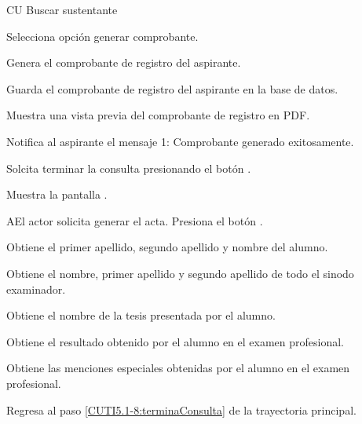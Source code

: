 \begin{UCtrayectoria}
	
	\UCpaso[\UCsist] CU Buscar sustentante
	
	\UCpaso[\UCsist] Selecciona opción generar comprobante.
	
	
	\UCpaso[\UCsist] Genera el comprobante de registro del aspirante.
	
	
	\UCpaso[\UCsist] Guarda el comprobante de registro del aspirante en la base de datos. 
	
	
	\UCpaso[\UCsist]Muestra una vista previa del comprobante de registro en PDF.
	
	
	\UCpaso[\UCsist] Notifica al aspirante el mensaje 1: Comprobante generado exitosamente.
	
	
	\UCpaso[\UCactor] Solcita terminar la consulta presionando el botón .  \label{CUTI5.1-8:terminaConsulta}
	
	\UCpaso[\UCsist] Muestra la pantalla .
	
\end{UCtrayectoria}


\begin{UCtrayectoriaA}{A}{El actor solicita generar el acta.}
	\UCpaso[\UCactor] Presiona el botón .
	
	\UCpaso[\UCsist] Obtiene el primer apellido, segundo apellido y nombre del alumno.
	
	\UCpaso[\UCsist] Obtiene el nombre, primer apellido y segundo apellido de todo el sinodo examinador.

	\UCpaso[\UCsist] Obtiene el nombre de la tesis presentada por el alumno.
	
	\UCpaso[\UCsist] Obtiene el resultado obtenido por el alumno en el examen profesional.
	
	\UCpaso[\UCsist] Obtiene las menciones especiales obtenidas por el alumno en el examen profesional.
	
	
			
	\UCpaso[] Regresa al paso \ref{CUTI5.1-8:terminaConsulta} de la trayectoria principal.
	
\end{UCtrayectoriaA}
